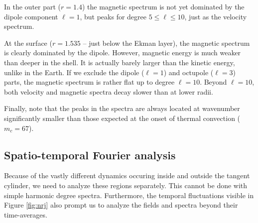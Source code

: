 \documentclass[12pt, a4paper]{article}
\begin{document}
In the outer part ($r=1.4$) the magnetic spectrum is not yet dominated by the dipole component $\ell=1$, but peaks for degree $5 \leq \ell \leq 10$, just as the velocity spectrum.

At the surface ($r=1.535$ -- just below the Ekman layer), the magnetic spectrum is clearly dominated by the dipole.
However, magnetic energy is much weaker than deeper in the shell.
It is actually barely larger than the kinetic energy, unlike in the Earth.
If we exclude the dipole ($\ell=1$) and octupole ($\ell=3$) parts, the magnetic spectrum is rather flat up to degree $\ell=10$.
Beyond $\ell=10$, both velocity and magnetic spectra decay slower than at lower radii.

Finally, note that the peaks in the spectra are always located at wavenumber significantly smaller than those expected at the onset of thermal convection ($m_c = 67$).

\subsection{Spatio-temporal Fourier analysis}

Because of the vastly different dynamics occuring inside and outside the tangent cylinder, we need to analyze these regions separately.
This cannot be done with simple harmonic degree spectra.
Furthermore, the temporal fluctuations visible in Figure \ref{fig:nrj} also prompt us to analyze the fields and spectra beyond their time-averages.
\end{document}
